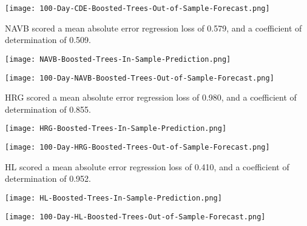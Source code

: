 \begin{center}  
    \texttt{[image: 100-Day-CDE-Boosted-Trees-Out-of-Sample-Forecast.png]}
    \label{fig:nonfloat}
\end{center}

NAVB scored a mean absolute error regression loss of 0.579, and a coefficient of determination of 0.509.

\begin{center}
    \texttt{[image: NAVB-Boosted-Trees-In-Sample-Prediction.png]}
    \label{fig:nonfloat}
\end{center}

\begin{center}  
    \texttt{[image: 100-Day-NAVB-Boosted-Trees-Out-of-Sample-Forecast.png]}
    \label{fig:nonfloat}
\end{center}

HRG scored a mean absolute error regression loss of 0.980, and a coefficient of determination of 0.855.

\begin{center}
    \texttt{[image: HRG-Boosted-Trees-In-Sample-Prediction.png]}
    \label{fig:nonfloat}
\end{center}

\begin{center}  
    \texttt{[image: 100-Day-HRG-Boosted-Trees-Out-of-Sample-Forecast.png]}
    \label{fig:nonfloat}
\end{center}

HL scored a mean absolute error regression loss of 0.410, and a coefficient of determination of 0.952.

\begin{center}
    \texttt{[image: HL-Boosted-Trees-In-Sample-Prediction.png]}
    \label{fig:nonfloat}
\end{center}

\begin{center}  
    \texttt{[image: 100-Day-HL-Boosted-Trees-Out-of-Sample-Forecast.png]}
    \label{fig:nonfloat}
\end{center}

